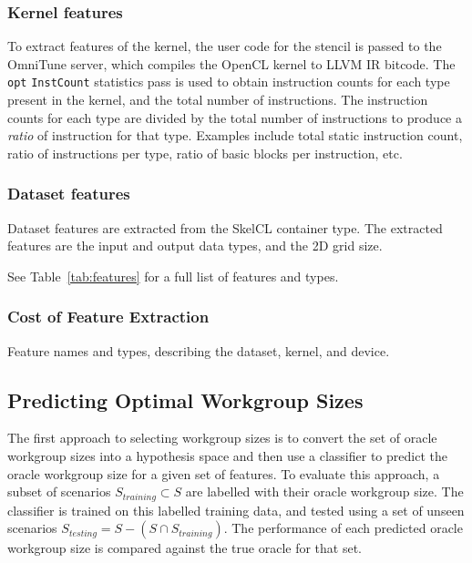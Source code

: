 \subsubsection{Kernel features}

To extract features of the kernel, the user code for the stencil is
passed to the OmniTune server, which compiles the OpenCL kernel to
LLVM IR bitcode. The \texttt{opt} \texttt{InstCount} statistics pass
is used to obtain instruction counts for each type present in the
kernel, and the total number of instructions. The instruction counts
for each type are divided by the total number of instructions to
produce a \emph{ratio} of instruction for that type. Examples include
total static instruction count, ratio of instructions per type, ratio
of basic blocks per instruction, etc.



\subsubsection{Dataset features}

Dataset features are extracted from the SkelCL container type. The
extracted features are the input and output data types, and the 2D
grid size.

See Table~\ref{tab:features} for a full list of features and
types.

\subsubsection{Cost of Feature Extraction}


\begin{table}

\caption{Feature names and types, describing the dataset, kernel,
  and device.}
\label{tab:features}
\end{table}


\subsection{Predicting Optimal Workgroup Sizes}

The first approach to selecting workgroup sizes is to convert the set
of oracle workgroup sizes into a hypothesis space and then use a
classifier to predict the oracle workgroup size for a given set of
features. To evaluate this approach, a subset of scenarios
$S_{training} \subset S$ are labelled with their oracle workgroup
size. The classifier is trained on this labelled training data, and
tested using a set of unseen scenarios
$S_{testing} = S - (S \cap S_{training})$. The performance of each
predicted oracle workgroup size is compared against the true oracle
for that set.



